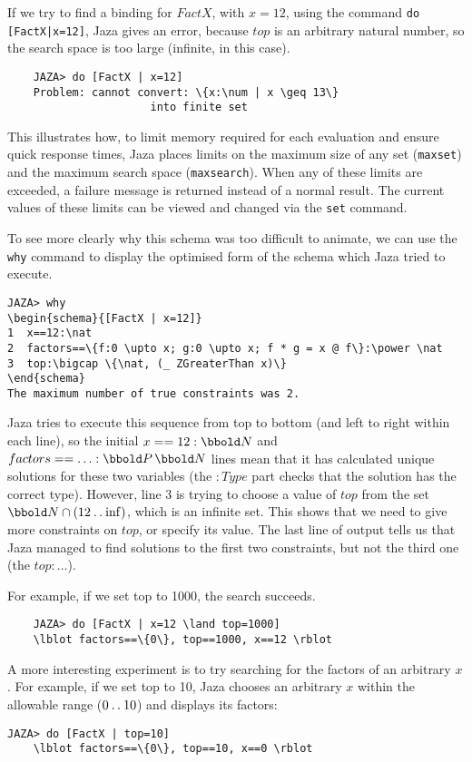 \documentclass[11pt]{article}
\newcommand{\Jaza}{Jaza}
\begin{document}
If we try to find a binding for $FactX$, with $x=12$, using the command
\verb!do [FactX|x=12]!, {\Jaza} gives an error, because $top$
is an arbitrary natural number, so the search space is
too large (infinite, in this case).
\begin{verbatim}
    JAZA> do [FactX | x=12]
    Problem: cannot convert: \{x:\num | x \geq 13\}
                      into finite set
\end{verbatim}

This illustrates how, to limit memory required for each evaluation and
ensure quick response times, {\Jaza} places limits on the maximum size of
any set (\texttt{maxset}) and the maximum search space (\texttt{maxsearch}).  
When any of these limits are exceeded, a failure message is returned
instead of a normal result.  The current values of these limits
can be viewed and changed via the \texttt{set} command.

To see more clearly why this schema was too difficult to
animate, we can use the \verb!why! command to display the
optimised form of the schema which Jaza tried to execute.
\begin{verbatim}
JAZA> why
\begin{schema}{[FactX | x=12]}
1  x==12:\nat
2  factors==\{f:0 \upto x; g:0 \upto x; f * g = x @ f\}:\power \nat
3  top:\bigcap \{\nat, (_ ZGreaterThan x)\}
\end{schema}
The maximum number of true constraints was 2.
\end{verbatim}

Jaza tries to execute this sequence from top to bottom (and left to right
within each line), 
so the initial $x==12:\nat$ and $factors==\ldots:\power \nat$ 
lines mean that it has calculated unique solutions for these two variables
(the $:Type$ part checks that the solution has the correct type).
However, line 3 is trying to choose a value of
$top$ from the set $\nat \cap (12 \upto \inf)$, which is
an infinite set.  This shows that we need to give more
constraints on $top$, or specify its value.  The last line
of output tells us that Jaza managed to find solutions to
the first two constraints, but not the third one (the $top:\ldots$).

For example, if we set top to 1000, the search succeeds.
\begin{verbatim}
    JAZA> do [FactX | x=12 \land top=1000]
    \lblot factors==\{0\}, top==1000, x==12 \rblot
\end{verbatim}

A more interesting experiment is to try searching for
the factors of an arbitrary $x$.
For example, if we set top to 10, Jaza chooses an
arbitrary $x$ within the allowable range ($0 \mathbin{\ldotp\ldotp} 10$)
and displays its factors:
\begin{verbatim}
JAZA> do [FactX | top=10]
    \lblot factors==\{0\}, top==10, x==0 \rblot
\end{verbatim}
\end{document}
